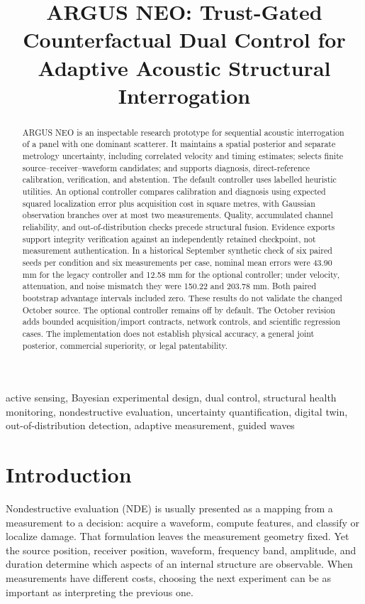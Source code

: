 \documentclass[conference]{IEEEtran}
\title{ARGUS NEO: Trust-Gated Counterfactual Dual Control for\\
Adaptive Acoustic Structural Interrogation}
\author{%
\IEEEauthorblockN{Ripan}
\IEEEauthorblockA{Independent Researcher\\India}
}
\begin{document}
\maketitle
\raggedbottom

\begin{abstract}
ARGUS NEO is an inspectable research prototype for sequential acoustic interrogation of a panel with one dominant scatterer. It maintains a spatial posterior and separate metrology uncertainty, including correlated velocity and timing estimates; selects finite source--receiver--waveform candidates; and supports diagnosis, direct-reference calibration, verification, and abstention. The default controller uses labelled heuristic utilities. An optional controller compares calibration and diagnosis using expected squared localization error plus acquisition cost in square metres, with Gaussian observation branches over at most two measurements. Quality, accumulated channel reliability, and out-of-distribution checks precede structural fusion. Evidence exports support integrity verification against an independently retained checkpoint, not measurement authentication. In a historical September synthetic check of six paired seeds per condition and six measurements per case, nominal mean errors were 43.90 mm for the legacy controller and 12.58 mm for the optional controller; under velocity, attenuation, and noise mismatch they were 150.22 and 203.78 mm. Both paired bootstrap advantage intervals included zero. These results do not validate the changed October source. The optional controller remains off by default. The October revision adds bounded acquisition/import contracts, network controls, and scientific regression cases. The implementation does not establish physical accuracy, a general joint posterior, commercial superiority, or legal patentability.
\end{abstract}

\begin{IEEEkeywords}
active sensing, Bayesian experimental design, dual control, structural health monitoring, nondestructive evaluation, uncertainty quantification, digital twin, out-of-distribution detection, adaptive measurement, guided waves
\end{IEEEkeywords}

\section{Introduction}
Nondestructive evaluation (NDE) is usually presented as a mapping from a measurement to a decision: acquire a waveform, compute features, and classify or localize damage. That formulation leaves the measurement geometry fixed. Yet the source position, receiver position, waveform, frequency band, amplitude, and duration determine which aspects of an internal structure are observable. When measurements have different costs, choosing the next experiment can be as important as interpreting the previous one.
\end{document}
